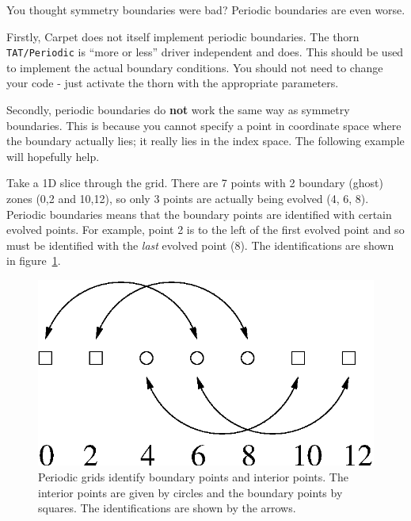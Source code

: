 \begin{enumerate}
  You thought symmetry boundaries were bad? Periodic boundaries are
  even worse.

  Firstly, Carpet does not itself implement periodic boundaries. The
  thorn {\tt TAT/Periodic} is ``more or less'' driver independent and
  does. This should be used to implement the actual boundary
  conditions. You should not need to change your code - just activate
  the thorn with the appropriate parameters.

  Secondly, periodic boundaries do {\bf not} work the same way as
  symmetry boundaries. This is because you cannot specify a point in
  coordinate space where the boundary actually lies; it really lies in
  the index space. The following example will hopefully help.
  
  Take a 1D slice through the grid. There are 7 points with 2 boundary
  (ghost) zones (0,2 and 10,12), so only 3 points are actually being
  evolved (4, 6, 8). Periodic boundaries means that the boundary points
  are identified with certain evolved points. For example, point 2 is
  to the left of the first evolved point and so must be identified
  with the \textit{last} evolved point (8). The identifications are
  shown in figure~\ref{fig:Periodic1}.
  \begin{figure}[htbp]
    \begin{center}
      \includegraphics[scale=0.5]{Periodic1.eps}
      \caption{Periodic grids identify boundary points and interior
        points. The interior points are given by circles and the
        boundary points by squares. The identifications are shown by the
        arrows.}
      \label{fig:Periodic1}
    \end{center}
  \end{figure}


\end{enumerate}
